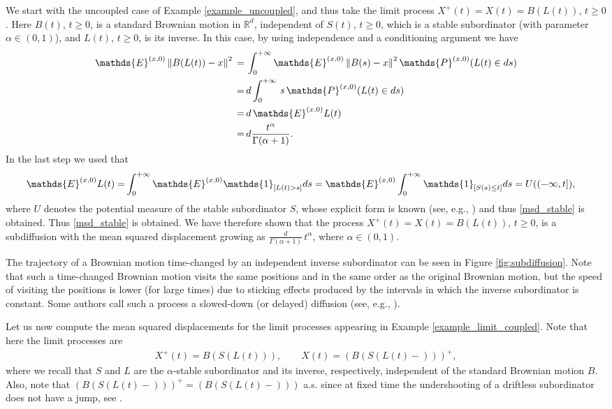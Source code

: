 \documentclass[reqno]{amsart}
\theoremstyle{remark}
\numberwithin{equation}{section} %
\newcommand{\RR}{\mathbb{R}}
\newcommand{\1}{\mathds{1}}
\begin{document}
	We start with the uncoupled case of Example \ref{example_uncoupled}, and thus take the limit process $X^+(t) = X(t) = B(L(t))$, $t \geq 0$. Here $B(t)$, $t\ge0$, is a standard Brownian motion in $\RR^d$, independent of $S(t)$, $t\ge0$, which is a stable subordinator (with parameter $\alpha\in(0,1)$), and $L(t)$, $t\ge0$, is its inverse. In this case, by using independence and a conditioning argument we have
	\begin{align}
		\mathds{E}^{(x,0)} \left\| B(L(t)) - x\right\|^2 \, = \, & \int_0^{+\infty}\mathds{E}^{(x,0)} \left\| B(s) - x \right\|^2 \mathds{P}^{(x,0)} (L(t) \in ds) \notag \\
		= \, & d\int_0^{+\infty}  \, s \, \mathds{P}^{(x,0)} (L(t) \in ds) \notag \\
		= \, & d\,\mathds{E}^{(x,0)}L(t) \notag \\
		= \, & d \frac{t^{\alpha}}{\Gamma (\alpha+1)}.
		\label{msd_stable}
	\end{align}
	In the last step we used that
	\begin{align}
		\mathds{E}^{(x,0)} L(t)  = & \int_0^{+\infty} \mathds{E}^{(x,0)} \mathds{1}_{[L(t)>s]} ds 
		=  \mathds{E}^{(x,0)}\int_0^{+\infty}  \mathds{1}_{[S(s)\leq t]} ds = U((-\infty,t]), \notag
	\end{align}
	where $U$ denotes the potential measure of the stable subordinator $S$, whose explicit form is known (see, e.g., \cite[Example 5.8]{bogdan2009potential}) and thus \eqref{msd_stable} is obtained. Thus \eqref{msd_stable} is obtained. We have therefore shown that the process $X^+(t)=X(t)=B(L(t))$, $t\ge0$, is a subdiffusion with the mean squared displacement growing as $\frac{d}{\Gamma(\alpha+1)}\,t^\alpha$, where $\alpha \in (0,1)$.
	
	The trajectory of a Brownian motion time-changed by an independent inverse subordinator can be seen in Figure \ref{fig:subdiffusion}. Note that such a time-changed Brownian motion visits the same positions and in the same order as the original Brownian motion, but the speed of visiting the positions is lower (for large times) due to sticking effects produced by the intervals in which the inverse subordinator is constant. Some authors call such a process a slowed-down (or delayed) diffusion (see, e.g., \cite{CapitanelliDOvidio2020, kochubei2008distributed, magdziarz2015asymptotic, toaldo2015}).
	
	Let us now compute the mean squared displacements for the limit processes appearing in Example \ref{example_limit_coupled}. Note that here the limit processes are
	\begin{align}
		X^+(t) = B(S(L(t))), \qquad X(t) = (B(S(L(t)-)))^+,
	\end{align}
	where we recall that $S$ and $L$ are the $\alpha$-stable subordinator and its inverse, respectively, independent of the standard Brownian motion $B$. Also, note that $(B(S(L(t)-)))^+=(B(S(L(t)-)))$ a.s. since at fixed time the undershooting of a driftless subordinator does not have a jump, see \cite[Proposition 2 \& Theorem 4, in Chapter 3]{bertoin1996}. 
	
\end{document}
